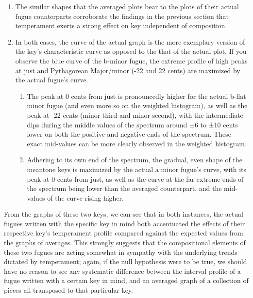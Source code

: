 \begin{enumerate}
\def\labelenumi{\arabic{enumi}.}
\tightlist
\item
  The similar shapes that the averaged plots bear to the plots of their
  actual fugue counterparts corroborate the findings in the previous
  section that temperament exerts a strong effect on key independent of
  composition.
\item
  In both cases, the curve of the actual graph is the more exemplary
  version of the key's characteristic curve as opposed to the that of
  the actual plot. If you observe the blue curve of the b-minor fugue,
  the extreme profile of high peaks at just and Pythagorean Major/minor
  (-22 and 22 cents) are maximized by the actual fugue's curve.

  \begin{enumerate}
  \def\labelenumii{\arabic{enumii}.}
  \tightlist
  \item
    The peak at 0 cents from just is pronouncedly higher for the actual
    b-flat minor fugue (and even more so on the weighted histogram), as
    well as the peak at -22 cents (minor third and minor second), with
    the intermediate dips during the middle values of the spectrum
    around ±6 to ±10 cents lower on both the positive and negative ends
    of the spectrum. These exact mid-values can be more clearly observed
    in the weighted histogram.
  \item
    Adhering to its own end of the spectrum, the gradual, even shape of
    the meantone keys is maximized by the actual a minor fugue's curve,
    with its peak at 0 cents from just, as well as the curve at the far
    extreme ends of the spectrum being lower than the averaged
    counterpart, and the mid-values of the curve rising higher.
  \end{enumerate}
\end{enumerate}

From the graphs of these two keys, we can see that in both instances,
the actual fugues written with the specific key in mind both accentuated
the effects of their respective key's temperament profile compared
against the expected values from the graphs of averages. This strongly
suggests that the compositional elements of these two fugues are acting
somewhat in sympathy with the underlying trends dictated by temperament;
again, if the null hypothesis were to be true, we should have no reason
to see any systematic difference between the interval profile of a fugue
written with a certain key in mind, and an averaged graph of a
collection of pieces all transposed to that particular key.

